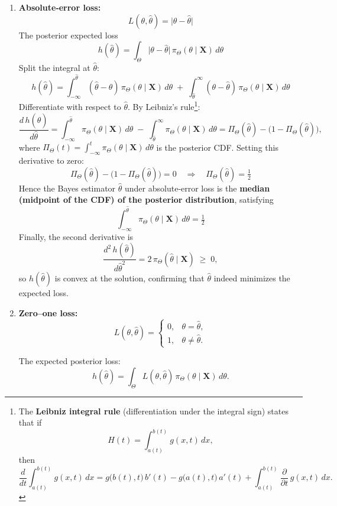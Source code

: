 \documentclass[twoside]{book}
\begin{document}
\begin{enumerate}
  \item \textbf{Absolute‐error loss:}
  \[
    L(\theta,\hat{\theta}) = \lvert \theta - \hat{\theta} \rvert
  \]
  The posterior expected loss
  \[
    h(\hat{\theta})
    = \int_{\Theta} \lvert \theta - \hat{\theta} \rvert \,\pi_{\Theta}(\theta \mid \mathbf{X})\,d\theta
  \]
  Split the integral at \(\hat{\theta}\):
  \[
    h(\hat{\theta})
    = \int_{-\infty}^{\hat{\theta}} (\hat{\theta} - \theta)\,\pi_{\Theta}(\theta\mid\mathbf{X})\,d\theta
      \;+\;
      \int_{\hat{\theta}}^{\infty} (\theta - \hat{\theta})\,\pi_{\Theta}(\theta\mid\mathbf{X})\,d\theta
  \]
  Differentiate with respect to \(\hat{\theta}\).  By Leibniz’s rule\footnote{The \textbf{Leibniz integral rule} (differentiation under the integral sign) states that if
  $$\displaystyle H(t) = \int_{a(t)}^{b(t)} g(x,t)\,dx,$$
  then
  \[
  \frac{d}{dt}\int_{a(t)}^{b(t)} g(x,t)\,dx
  = g\bigl(b(t),t\bigr)\,b'(t)
  - g\bigl(a(t),t\bigr)\,a'(t)
  + \int_{a(t)}^{b(t)} \frac{\partial}{\partial t}\,g(x,t)\,dx.
  \]}:
  \[
    \frac{d\,h(\hat{\theta})}{d \hat{\theta}}
    = \int_{-\infty}^{\hat{\theta}} \pi_{\Theta}(\theta\mid\mathbf{X})\,d\theta
      \;-\;
      \int_{\hat{\theta}}^{\infty} \pi_{\Theta}(\theta\mid\mathbf{X})\,d\theta
    = \Pi_{\Theta}(\hat{\theta}) - \bigl(1 - \Pi_{\Theta}(\hat{\theta})\bigr),
  \]
  where \(\Pi_{\Theta}(t)=\int_{-\infty}^{t}\pi_{\Theta}(\theta\mid\mathbf{X})\,d\theta\) is the posterior CDF.  Setting this derivative to zero:
  \[
    \Pi_{\Theta}(\hat{\theta}) - \bigl(1 - \Pi_{\Theta}(\hat{\theta})\bigr) = 0
    \quad\Longrightarrow\quad
    \Pi_{\Theta}(\hat{\theta}) = \tfrac12
  \]
  Hence the Bayes estimator \(\hat{\theta}\) under absolute‐error loss is the \textbf{median (midpoint of the CDF) of the posterior distribution}, satisfying
  \[
    \int_{-\infty}^{\hat{\theta}}\pi_{\Theta}(\theta\mid\mathbf{X})\,d\theta = \tfrac12
  \]
  Finally, the second derivative is
  \[
    \frac{d^2\,h(\hat{\theta})}{d \hat{\theta}^2}
    = 2\,\pi_{\Theta}(\hat{\theta}\mid\mathbf{X}) \;\ge\; 0,
  \]
  so \(h(\hat{\theta})\) is convex at the solution, confirming that \(\hat{\theta}\) indeed minimizes the expected loss.


  \item \textbf{Zero–one loss:}
  \[
    L(\theta,\hat{\theta}) =
    \begin{cases}
      0, & \theta = \hat{\theta},\\
      1, & \theta \neq \hat{\theta}.
    \end{cases}
  \]

  The expected posterior loss:
  \[
    h(\hat{\theta}) = \int_{\Theta} L(\theta,\hat{\theta})\,\pi_{\Theta}(\theta\mid \mathbf{X})\,d\theta.
  \]


\end{enumerate}
\end{document}
